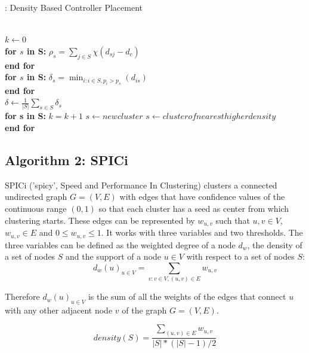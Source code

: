 \documentclass[8pt]{extarticle}
\begin{document}
	\begin{algorithm}
		\caption{: Density Based Controller Placement}\label{euclid}
		\begin{algorithmic}[1]
			 \\
			$k \gets 0$ \\
			\textbf{for $s$ in S:}
			\State $\rho_s=\sum_{j\in S}\chi(d_{sj}-d_c)$ \\
			\textbf{end for} \\
			\textbf{for $s$ in S:}
			\State $\delta_s=\min_{i:i\in S,p_i>p_s}(d_{is})$ \\
			\textbf{end for} \\
			$\delta \gets \frac{1}{|S|}\sum_{s\in S}\delta_s$ \\
			\textbf{for s in S:}
				\State $k = k + 1$
				\State $s \gets newcluster$
			\Else
				\State $s \gets cluster of nearest higher density$
			\EndIf \\
			\textbf{end for}
			\EndProcedure
		\end{algorithmic}
	\end{algorithm}
	
	
	\subsection{Algorithm 2: SPICi}
	
	SPICi ('spicy', Speed and Performance In Clustering) clusters a connected undirected graph $G=(V,E)$ with edges that have confidence values of the continuous range $(0,1)$ so that each cluster has a seed as center from which clustering starts. These edges can be represented by $w_{u,v}$ such that $u,v\in V$, $w_{u,v}\in E$ and $0\le w_{u,v}\le1$. It works with three variables and two thresholds. The three variables can be defined as the weighted degree of a node $d_w$, the density of a set of nodes $S$ and the support of a node $u\in V$ with respect to a set of nodes $S$:
	\begin{equation}
	d_w(u)_{u\in V} = \sum_{v:v\in V,(u,v) \in E}w_{u,v}
	\end{equation}
	
	Therefore $d_w(u)_{u\in V}$ is the sum of all the weights of the edges that connect $u$ with any other adjacent node $v$ of the graph $G=(V,E)$.
	
	\begin{equation}
	density(S) = \frac{\sum_{(u,v)\in E}w_{u,v}}{|S|*(|S|-1)/2} 
	\end{equation}
	
\end{document}
